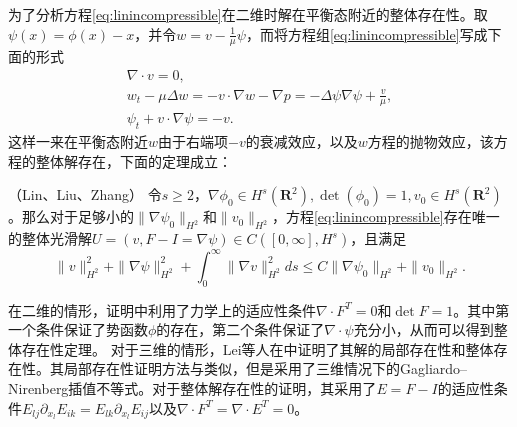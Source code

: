 为了分析方程\eqref{eq:linincompressible}在二维时解在平衡态附近的整体存在性。取$\psi(x) = \phi(x)-x$，并令$w=v-\frac{1}{\mu}\psi$，而将方程组\eqref{eq:linincompressible}写成下面的形式
\begin{eqnarray*}
	\nabla \cdot v =0 , \\
	w_t - \mu \Delta w = - v \cdot \nabla w - \nabla p = - \Delta \psi \nabla \psi + \frac{v}{\mu}, \\
	\psi_t + v \cdot \nabla \psi = -v.
\end{eqnarray*}
这样一来在平衡态附近$w$由于右端项$-v$的衰减效应，以及$w$方程的抛物效应，该方程的整体解存在，下面的定理成立：
\begin{theorem}（Lin、Liu、Zhang\cite{lin2005hydrodynamics}）
	令$s \ge 2$，$\nabla \phi_0 \in H^s(\mathbf{R}^2),\det(\phi_0) = 1, v_0 \in H^s(\mathbf{R}^2)$。那么对于足够小的$\|\nabla \psi_0\|_{H^2}$和$\|v_0\|_{H^2}$，方程\eqref{eq:linincompressible}存在唯一的整体光滑解$U=(v,F-I=\nabla \psi) \in C([0,\infty],H^s)$，且满足
	\begin{equation*}
		\|v\|_{H^2}^2 +\|\nabla \psi\|_{H^2}^2 + \int_0^\infty \|\nabla v\|_{H^2}
^2ds \le C \|\nabla \psi_0\|_{H^2} + \|v_0\|_{H^2}.
	\end{equation*}
	\end{theorem}
	在二维的情形，证明中利用了力学上的适应性条件$\nabla \cdot F^T = 0$和$\det F =1$。其中第一个条件保证了势函数$\phi$的存在，第二个条件保证了$\nabla \cdot \psi$充分小，从而可以得到整体存在性定理。
对于三维的情形，Lei等人在\cite{lei2008global}中证明了其解的局部存在性和整体存在性。其局部存在性证明方法与\cite{lin2005hydrodynamics}类似，但是采用了三维情况下的Gagliardo–Nirenberg插值不等式。对于整体解存在性的证明，其采用了$E=F-I$的适应性条件$E_{lj}\partial_{x_l} E_{ik}=E_{lk}\partial_{x_l} E_{ij}$以及$\nabla \cdot F^T=\nabla \cdot E^T=0$。

